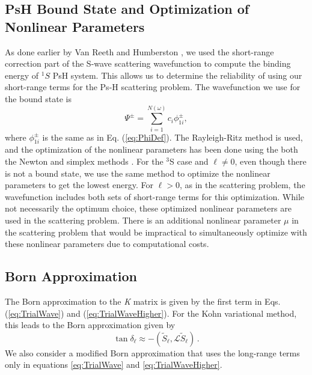 \documentclass[reprint,showpacs,preprintnumbers,amsmath,amssymb,pra,aps]{revtex4-1}
\begin{document}

\subsection{PsH Bound State and Optimization of Nonlinear Parameters}
As done earlier by Van Reeth and Humberston \cite{VanReeth2003,VanReeth2004}, we used the short-range correction part of the S-wave scattering wavefunction to compute the binding energy of $^1S$ PsH system. This allows us to determine the reliability of using our short-range terms for the Ps-H scattering problem. The wavefunction we use for the bound state is
\begin{equation}
\label{eq:BoundWavefn}
\Psi^\pm = \sum_{i=1}^{N(\omega)} c_i \phi_{1i}^\pm,
\end{equation}
where $\phi_{1i}^\pm$ is the same as in Eq. (\ref{eq:PhiDef}). The Rayleigh-Ritz method is used, and the optimization of the nonlinear parameters has been done using the both the Newton and simplex methods \cite{Yan1999,GSL}. For the $^3$S case and $\ell \neq 0$, even though there is not a bound state, we use the same method to optimize the nonlinear parameters to get the lowest energy. For $\ell > 0$, as in the scattering problem, the wavefunction includes both sets of short-range terms for this optimization. While not necessarily the optimum choice, these optimized nonlinear parameters are used in the scattering problem. There is an additional nonlinear parameter $\mu$ in the scattering problem that would be impractical to simultaneously optimize with these nonlinear parameters due to computational costs.

\subsection{Born Approximation}
The Born approximation to the \emph{K} matrix \cite{Bransden2003} is given by the first term in Eqs. (\ref{eq:TrialWave}) and (\ref{eq:TrialWaveHigher}). For the Kohn variational method, this leads to the Born approximation given by
\begin{equation}
\label{eq:Born}
\tan\delta_\ell \approx -(\widetilde{S}_\ell,\mathcal{L}\widetilde{S}_\ell )\, .
\end{equation}
We also consider a modified Born approximation that uses the long-range terms only in equations \ref{eq:TrialWave} and \ref{eq:TrialWaveHigher}.
\end{document}
